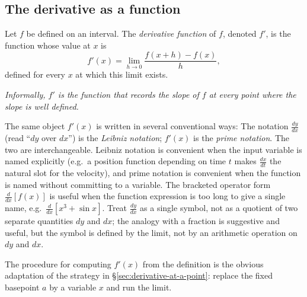 \subsection{The derivative as a function}

\begin{definition}\label{def:derivative-function}
Let \(f\) be defined on an interval. The \emph{derivative function} of \(f\), denoted \(f'\), is the function whose value at \(x\) is
\[
f'(x) = \lim_{h \to 0} \frac{f(x + h) - f(x)}{h},
\]
defined for every \(x\) at which this limit exists.

\emph{Informally, \(f'\) is the function that records the slope of \(f\) at every point where the slope is well defined.}
\end{definition}

\begin{caution}
The same object \(f'(x)\) is written in several conventional ways:
The notation \(\frac{dy}{dx}\) (read ``\(dy\) over \(dx\)'') is the \emph{Leibniz notation}; \(f'(x)\) is the \emph{prime notation}. The two are interchangeable. Leibniz notation is convenient when the input variable is named explicitly (e.g.\ a position function depending on time \(t\) makes \(\frac{dx}{dt}\) the natural slot for the velocity), and prime notation is convenient when the function is named without committing to a variable. The bracketed operator form \(\frac{d}{dx}[f(x)]\) is useful when the function expression is too long to give a single name, e.g.\ \(\frac{d}{dx}[x^{3} + \sin x]\). Treat \(\frac{dy}{dx}\) as a single symbol, not as a quotient of two separate quantities \(dy\) and \(dx\); the analogy with a fraction is suggestive and useful, but the symbol is defined by the limit, not by an arithmetic operation on \(dy\) and \(dx\).
\end{caution}

The procedure for computing \(f'(x)\) from the definition is the obvious adaptation of the strategy in §\ref{sec:derivative-at-a-point}: replace the fixed basepoint \(a\) by a variable \(x\) and run the limit.


